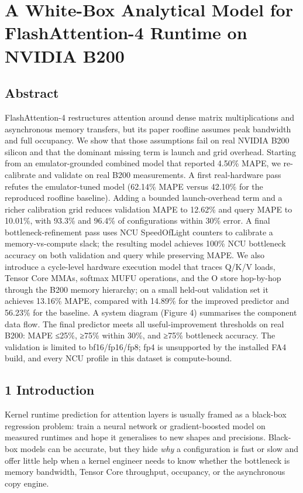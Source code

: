 \section{A White-Box Analytical Model for FlashAttention-4 Runtime on
NVIDIA
B200}\label{a-white-box-analytical-model-for-flashattention-4-runtime-on-nvidia-b200}

\subsection{Abstract}\label{abstract}

FlashAttention-4 restructures attention around dense matrix
multiplications and asynchronous memory transfers, but its paper
roofline assumes peak bandwidth and full occupancy. We show that those
assumptions fail on real NVIDIA B200 silicon and that the dominant
missing term is launch and grid overhead. Starting from an
emulator-grounded combined model that reported 4.50\% MAPE, we
re-calibrate and validate on real B200 measurements. A first
real-hardware pass refutes the emulator-tuned model (62.14\% MAPE versus
42.10\% for the reproduced roofline baseline). Adding a bounded
launch-overhead term and a richer calibration grid reduces validation
MAPE to 12.62\% and query MAPE to 10.01\%, with 93.3\% and 96.4\% of
configurations within 30\% error. A final bottleneck-refinement pass
uses NCU SpeedOfLight counters to calibrate a memory-vs-compute slack;
the resulting model achieves 100\% NCU bottleneck accuracy on both
validation and query while preserving MAPE. We also introduce a
cycle-level hardware execution model that traces Q/K/V loads, Tensor
Core MMAs, softmax MUFU operations, and the O store hop-by-hop through
the B200 memory hierarchy; on a small held-out validation set it
achieves 13.16\% MAPE, compared with 14.89\% for the improved predictor
and 56.23\% for the baseline. A system diagram (Figure 4) summarises the
component data flow. The final predictor meets all useful-improvement
thresholds on real B200: MAPE ≤25\%, ≥75\% within 30\%, and ≥75\%
bottleneck accuracy. The validation is limited to bf16/fp16/fp8; fp4 is
unsupported by the installed FA4 build, and every NCU profile in this
dataset is compute-bound.

\subsection{1 Introduction}\label{introduction}

Kernel runtime prediction for attention layers is usually framed as a
black-box regression problem: train a neural network or gradient-boosted
model on measured runtimes and hope it generalises to new shapes and
precisions. Black-box models can be accurate, but they hide \emph{why} a
configuration is fast or slow and offer little help when a kernel
engineer needs to know whether the bottleneck is memory bandwidth,
Tensor Core throughput, occupancy, or the asynchronous copy engine.

